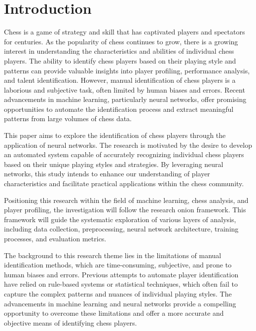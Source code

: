 
\chapter{Introduction}
\begin{spacing}{2.0}

Chess is a game of strategy and skill that has captivated players and spectators for centuries. As the popularity of chess continues to grow, there is a growing interest in understanding the characteristics and abilities of individual chess players. The ability to identify chess players based on their playing style and patterns can provide valuable insights into player profiling, performance analysis, and talent identification. However, manual identification of chess players is a laborious and subjective task, often limited by human biases and errors. Recent advancements in machine learning, particularly neural networks, offer promising opportunities to automate the identification process and extract meaningful patterns from large volumes of chess data.

This paper aims to explore the identification of chess players through the application of neural networks. The research is motivated by the desire to develop an automated system capable of accurately recognizing individual chess players based on their unique playing styles and strategies. By leveraging neural networks, this study intends to enhance our understanding of player characteristics and facilitate practical applications within the chess community.

Positioning this research within the field of machine learning, chess analysis, and player profiling, the investigation will follow the research onion framework. This framework will guide the systematic exploration of various layers of analysis, including data collection, preprocessing, neural network architecture, training processes, and evaluation metrics.

The background to this research theme lies in the limitations of manual identification methods, which are time-consuming, subjective, and prone to human biases and errors. Previous attempts to automate player identification have relied on rule-based systems or statistical techniques, which often fail to capture the complex patterns and nuances of individual playing styles. The advancements in machine learning and neural networks provide a compelling opportunity to overcome these limitations and offer a more accurate and objective means of identifying chess players.


\end{spacing}
